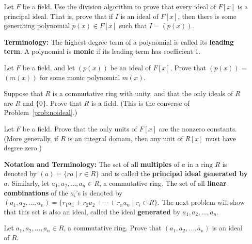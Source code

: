 \begin{problem}\label{prob:fieldprin}
Let \(F\) be a field. Use the division algorithm to prove that every ideal of \(F[x]\) is a principal ideal. That is, prove that if \(I\) is an ideal of \(F[x]\), then there is some generating polynomial \(p(x) \in F[x]\) such that \(I = \left(p(x)\right)\).
\begin{annotation}
\end{annotation}
\end{problem}

\textbf{Terminology:} The highest-degree term of a polynomial is called its \textbf{leading term}. A polynomial is \textbf{monic} if its leading term has coefficient \(1\).

\begin{problem}
Let \(F\) be a field, and let \((p(x))\) be an ideal of \(F[x]\). Prove that \((p(x))\) = \((m(x))\) for some monic polynomial \(m(x)\).
\end{problem}

\begin{problem}
Suppose that \(R\) is a commutative ring with unity, and that the only ideals of \(R\) are \(R\) and \(\{0\}\). Prove that \(R\) is a field. (This is the converse of Problem~\ref{prob:noideal}.)
\end{problem}

\begin{problem}
Let \(F\) be a field. Prove that the only units of \(F[x]\) are the nonzero constants. (More generally, if \(R\) is an integral domain, then any unit of \(R[x]\) must have degree zero.)
\end{problem}

\textbf{Notation and Terminology:} The set of all \textbf{multiples} of \(a\) in a ring \(R\) is denoted by \((a) = \{ra \mid r\in R\}\) and is called the \textbf{principal ideal generated by} \(a\). Similarly, let \(a_1, a_2, \ldots, a_n \in R\), a commutative ring. The set of all \textbf{linear combinations} of the \(a_i\)'s is denoted by \((a_1, a_2, \ldots, a_n) = \{r_1a_1 + r_2a_2 + \cdots + r_na_n \mid r_i \in R\} \). The next problem will show that this set is also an ideal, called the ideal \textbf{generated} by \(a_1, a_2, \ldots, a_n\).

\begin{problem}
Let \(a_1, a_2, \ldots, a_n \in R\), a commutative ring. Prove that \((a_1, a_2, \ldots, a_n)\) is an ideal of \(R\).
\end{problem}

